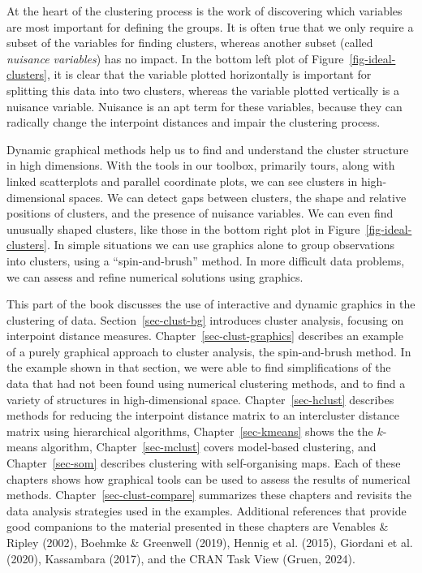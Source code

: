 \documentclass[
  letterpaper,
]{krantz}
\begin{document}
At the heart of the clustering process is the work of discovering which
variables are most important for defining the groups. It is often true
that we only require a subset of the variables for finding clusters,
whereas another subset (called \emph{nuisance variables}) has no impact.
In the bottom left plot of Figure~\ref{fig-ideal-clusters}, it is clear
that the variable plotted horizontally is important for splitting this
data into two clusters, whereas the variable plotted vertically is a
nuisance variable. Nuisance is an apt term for these variables, because
they can radically change the interpoint distances and impair the
clustering process. 

Dynamic graphical methods help us to find and understand the cluster
structure in high dimensions. With the tools in our toolbox, primarily
tours, along with linked scatterplots and parallel coordinate plots, we
can see clusters in high-dimensional spaces. We can detect gaps between
clusters, the shape and relative positions of clusters, and the presence
of nuisance variables. We can even find unusually shaped clusters, like
those in the bottom right plot in Figure~\ref{fig-ideal-clusters}. In
simple situations we can use graphics alone to group observations into
clusters, using a ``spin-and-brush'' method. In more difficult data
problems, we can assess and refine numerical solutions using
graphics.

This part of the book discusses the use of interactive and dynamic
graphics in the clustering of data. Section~\ref{sec-clust-bg}
introduces cluster analysis, focusing on interpoint distance measures.
Chapter~\ref{sec-clust-graphics} describes an example of a purely
graphical approach to cluster analysis, the spin-and-brush method. In
the example shown in that section, we were able to find simplifications
of the data that had not been found using numerical clustering methods,
and to find a variety of structures in high-dimensional space.
Chapter~\ref{sec-hclust} describes methods for reducing the interpoint
distance matrix to an intercluster distance matrix using hierarchical
algorithms, Chapter~\ref{sec-kmeans} shows the the \(k\)-means
algorithm, Chapter~\ref{sec-mclust} covers model-based clustering, and
Chapter~\ref{sec-som} describes clustering with self-organising maps.
Each of these chapters shows how graphical tools can be used to assess
the results of numerical methods. Chapter~\ref{sec-clust-compare}
summarizes these chapters and revisits the data analysis strategies used
in the examples. Additional references that provide good companions to
the material presented in these chapters are Venables \& Ripley (2002),
Boehmke \& Greenwell (2019), Hennig et al. (2015), Giordani et al.
(2020), Kassambara (2017), and the CRAN Task View (Gruen, 2024).
\end{document}
